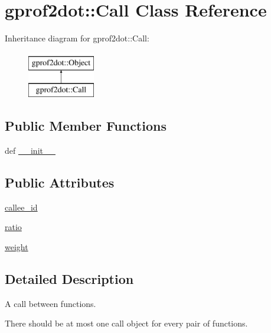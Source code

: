 \hypertarget{classgprof2dot_1_1Call}{
\section{gprof2dot::Call Class Reference}
\label{classgprof2dot_1_1Call}
}
Inheritance diagram for gprof2dot::Call:\begin{figure}[H]
\begin{center}
\leavevmode
\includegraphics[height=2.000000cm]{classgprof2dot_1_1Call}
\end{center}
\end{figure}
\subsection*{Public Member Functions}
\begin{DoxyCompactItemize}
\item 
def \hyperlink{classgprof2dot_1_1Call_a2e6af456964a01d7fa4768224fbf729c}{\_\-\_\-init\_\-\_\-}
\end{DoxyCompactItemize}
\subsection*{Public Attributes}
\begin{DoxyCompactItemize}
\item 
\hyperlink{classgprof2dot_1_1Call_ac28cb11c1eb7879b1d4d1c7d565b4f4e}{callee\_\-id}
\item 
\hyperlink{classgprof2dot_1_1Call_ad8b10e2156b9956184d55d4848721c93}{ratio}
\item 
\hyperlink{classgprof2dot_1_1Call_ab112a157165a7e938383281eb8754830}{weight}
\end{DoxyCompactItemize}


\subsection{Detailed Description}
\begin{DoxyVerb}A call between functions.

There should be at most one call object for every pair of functions.
\end{DoxyVerb}
 


